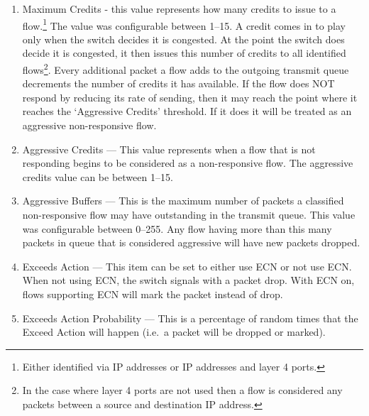 \documentclass[12pt]{article}
\begin{document}
\begin{enumerate}

\item Maximum Credits - this value represents how many credits to issue to a
flow.\footnote{Either identified via IP addresses or IP addresses and layer 4 ports.}
The value was configurable between 1--15. A credit comes in to play only when
the switch decides it is congested. At the point the switch does decide it is
congested, it then issues this number of credits to all identified flows\footnote{In the
case where layer 4 ports are not used then a flow is considered any packets between
a source and destination IP address.}. Every additional packet a flow adds to the outgoing
transmit queue decrements the number of credits it has available. If the flow does NOT
respond by reducing its rate of sending, then it may reach the point where it reaches the `Aggressive
Credits' threshold. If it does it will be treated as an aggressive non-responsive flow.


\item Aggressive Credits --- This value represents when a flow that is not responding begins
to be considered as a non-responsive flow. The aggressive credits value
can be between 1--15.

\item Aggressive Buffers --- This is the maximum number of packets a classified non-responsive
flow may have outstanding in the transmit queue. This value was configurable  between 0--255.
Any flow having more than this many packets in queue that is considered aggressive will have
new packets dropped.

\item Exceeds Action --- This item can be set to either use ECN or not use ECN. When not
using ECN, the switch signals with a packet drop. With ECN on, flows supporting
ECN will mark the packet instead of drop.

\item Exceeds Action Probability --- This is a percentage of random times that the Exceed
Action will happen (i.e.~a packet will be dropped or marked).

\end{enumerate}
\end{document}
